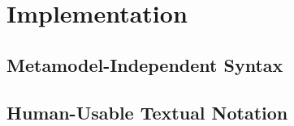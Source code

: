 
\chapter{Implementation}
\label{Implementation}

\section{Metamodel-Independent Syntax}



\section{Human-Usable Textual Notation}


